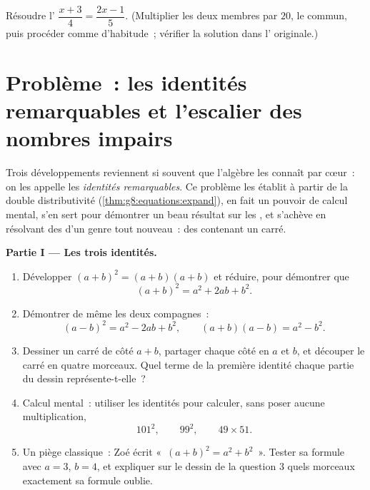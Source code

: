 \begin{exercise}[$\star\star\star$]\label{exo:g8:equations:12}
Résoudre l' $\dfrac{x + 3}{4} = \dfrac{2x - 1}{5}$.
(Multiplier les deux membres par $20$, le  commun, puis
procéder comme d'habitude~; vérifier la solution dans l'
originale.)
\end{exercise}

\section{Problème~: les identités remarquables et l'escalier des
nombres impairs}

\begin{problem}[{Devoir maison --- $(a+b)^2$, $(a-b)^2$,
$(a+b)(a-b)$, et la somme $1 + 3 + 5 + \dots + (2n-1) = n^2$}]
\label{pb:g8:equations:1}
Trois développements reviennent si souvent que l'algèbre les connaît
par cœur~: on les appelle les \emph{identités remarquables}. Ce
problème les établit à partir de la double distributivité
(\cref{thm:g8:equations:expand}), en fait un pouvoir de calcul
mental, s'en sert pour démontrer un beau résultat sur les , et s'achève en résolvant des  d'un genre tout
nouveau~: des  contenant un carré.

\medskip
\noindent\textbf{Partie I --- Les trois identités.}
\begin{enumerate}
  \item Développer $(a + b)^2 = (a + b)(a + b)$ et réduire, pour
        démontrer que
        \[
        (a + b)^2 = a^2 + 2ab + b^2 .
        \]
  \item Démontrer de même les deux compagnes~:
        \[
        (a - b)^2 = a^2 - 2ab + b^2,
        \qquad
        (a + b)(a - b) = a^2 - b^2 .
        \]
  \item Dessiner un carré de côté $a + b$, partager chaque côté en
        $a$ et $b$, et découper le carré en quatre morceaux. Quel
        terme de la première identité chaque partie du dessin
        représente-t-elle~?
  \item Calcul mental~: utiliser les identités pour calculer, sans
        poser aucune multiplication,
        \[
        101^2, \qquad 99^2, \qquad 49 \times 51 .
        \]
  \item Un piège classique~: Zoé écrit «~$(a + b)^2 = a^2 + b^2$~».
        Tester sa formule avec $a = 3$, $b = 4$, et expliquer sur le
        dessin de la question 3 quels morceaux exactement sa formule
        oublie.
\end{enumerate}


\end{problem}

